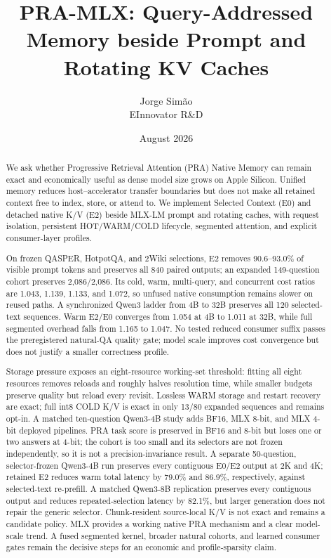 \documentclass[10pt]{article}
\title{PRA-MLX: Query-Addressed Memory beside Prompt and Rotating KV Caches}
\author{Jorge Sim\~ao\\EInnovator R\&D}
\date{August 2026}
\begin{document}
\maketitle

\begin{abstract}
We ask whether Progressive Retrieval Attention (PRA) Native Memory can remain
exact and economically useful as dense model size grows on Apple Silicon.
Unified memory reduces host--accelerator transfer boundaries but does not make
all retained context free to index, store, or attend to. We implement
Selected Context (E0) and detached native K/V (E2) beside MLX-LM prompt and
rotating caches, with request isolation, persistent HOT/WARM/COLD lifecycle,
segmented attention, and explicit consumer-layer profiles.

On frozen QASPER, HotpotQA, and 2Wiki selections, E2 removes 90.6--93.0\% of
visible prompt tokens and preserves all 840 paired outputs; an expanded
149-question cohort preserves 2,086/2,086. Its cold, warm, multi-query, and
concurrent cost ratios are 1.043, 1.139, 1.133, and 1.072, so unfused native
consumption remains slower on reused paths. A synchronized Qwen3 ladder from
4B to 32B preserves all 120 selected-text sequences. Warm E2/E0 converges from
1.054 at 4B to 1.011 at 32B, while full segmented overhead falls from 1.165 to
1.047. No tested reduced consumer suffix passes the preregistered natural-QA
quality gate; model scale improves cost convergence but does not justify a
smaller correctness profile.

Storage pressure exposes an eight-resource working-set threshold: fitting all
eight resources removes reloads and roughly halves resolution time, while
smaller budgets preserve quality but reload every revisit. Lossless WARM
storage and restart recovery are exact; full int8 COLD K/V is exact in only
13/80 expanded sequences and remains opt-in. A matched ten-question Qwen3-4B
study adds BF16, MLX 8-bit, and MLX 4-bit deployed pipelines. PRA task score is
preserved in BF16 and 8-bit but loses one or two answers at 4-bit; the cohort
is too small and its selectors are not frozen independently, so it is not a
precision-invariance result. A separate 50-question, selector-frozen Qwen3-4B
run preserves every contiguous E0/E2 output at 2K and 4K; retained E2 reduces
warm total latency by 79.0\% and 86.9\%, respectively, against selected-text
re-prefill. A matched Qwen3-8B replication preserves every contiguous output and
reduces repeated-selection latency by 82.1\%, but larger generation does not
repair the generic selector. Chunk-resident source-local K/V is not exact and
remains a candidate policy. MLX provides a working native PRA mechanism and a
clear model-scale trend. A fused segmented kernel, broader natural cohorts,
and learned consumer gates remain the decisive steps for an economic and
profile-sparsity claim.
\end{abstract}
\end{document}
